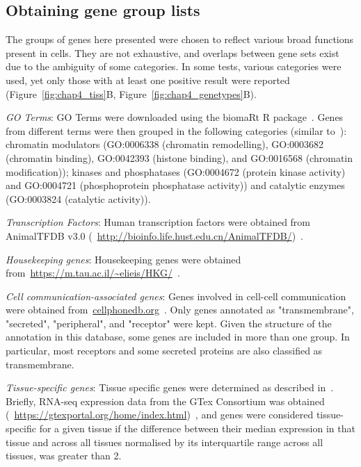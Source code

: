 \subsection{Obtaining gene group lists}
\label{section4.4_genelists}
The groups of genes here presented were chosen to reflect various broad functions present in cells. They are not exhaustive, and overlaps between gene sets exist due to the ambiguity of some categories. In some tests, various categories were used, yet only those with at least one positive result were reported (Figure~\ref{fig:chap4_tiss}B, Figure~\ref{fig:chap4_genetypes}B).

\textit{GO Terms}: GO Terms were downloaded using the biomaRt R package~\citep{durinck_mapping_2009}. Genes from different terms were then grouped in the following categories (similar to~\citep{hagai_gene_2018}): chromatin modulators (GO:0006338 (chromatin remodelling), GO:0003682 (chromatin binding), GO:0042393 (histone binding), and GO:0016568 (chromatin modification)); kinases and phosphatases (GO:0004672 (protein kinase activity) and GO:0004721 (phosphoprotein phosphatase activity)) and catalytic enzymes (GO:0003824 (catalytic activity)).

\textit{Transcription Factors}: Human transcription factors were obtained from AnimalTFDB v3.0 (~\url{http://bioinfo.life.hust.edu.cn/AnimalTFDB/})~\citep{hu_animaltfdb_2019}.

\textit{Housekeeping genes}: Housekeeping genes were obtained from~\url{https://m.tau.ac.il/~elieis/HKG/}~\citep{eisenberg_human_2013}.

\textit{Cell communication-associated genes}: Genes involved in cell-cell communication were obtained from~\url{cellphonedb.org}~\citep{efremova_cellphonedb_2019}. Only genes annotated as "transmembrane", "secreted", "peripheral", and "receptor" were kept. Given the structure of the annotation in this database, some genes are included in more than one group. In particular, most receptors and some secreted proteins are also classified as transmembrane.

\textit{Tissue-specific genes}: Tissue specific genes were determined as described in~\citep{sonawane_understanding_2017}. Briefly, RNA-seq expression data from the GTex Consortium was obtained (~\url{https://gtexportal.org/home/index.html})~\citep{consortium_genotype-tissue_2015}, and genes were considered tissue-specific for a given tissue if the difference between their median expression in that tissue and across all tissues normalised by its interquartile range across all tissues, was greater than 2.



